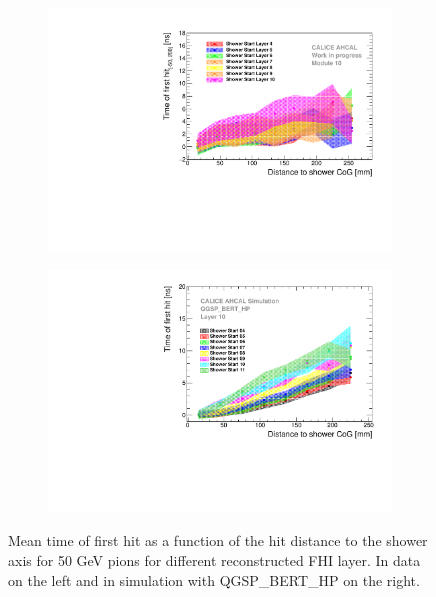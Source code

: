 \begin{figure}[htbp!]
	\begin{subfigure}[t]{0.5\textwidth}
		\centering
		\includegraphics[width=1\textwidth]{../Thesis_Plots/Timing/Pions/Plots/Timing_Radius_Comparison_ShortAsymRange_ShowerStart_FixedModule.pdf}
		\caption{}\label{fig:Radius_FHI_Fixed}
	\end{subfigure}
	\hfill
	\begin{subfigure}[t]{0.5\textwidth}
		\centering
		\includegraphics[width=1\textwidth]{../Thesis_Plots/Timing/Pions/Plots/Radius_ShowerStartTruth_FixedModule.pdf}
		\caption{}\label{fig:Radius_FHI_FixedSim}
	\end{subfigure}
	\caption{Mean time of first hit as a function of the hit distance to the shower axis for 50 GeV pions for different reconstructed FHI layer. In data on the left and in simulation with QGSP\_BERT\_HP on the right.}
	\label{fig:Radius_FHISim}
\end{figure}

